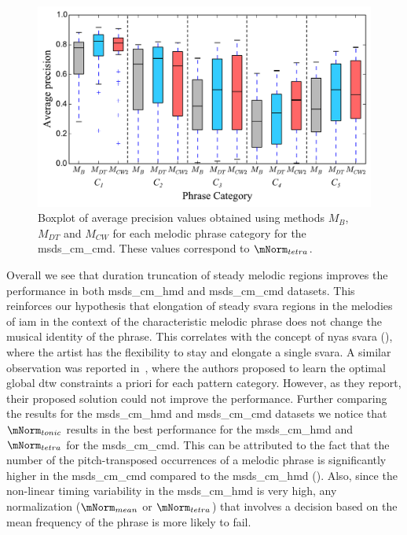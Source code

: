 \begin{figure}
	\begin{center}
		\includegraphics[width=\figSizeEightyFive]{ch06_patterns/figures/ImprovingSimilarity/CarnaticPerCategoryPerformance_BOXPLOT.pdf}
	\end{center}
	\caption{Boxplot of average precision values obtained using methods $M_{B}$, $M_{DT}$ and $M_{CW}$ for each melodic phrase category for the \acrshort{msds_cm_cmd}. These values correspond to $\mNorm_{tetra}$.}
	\label{fig:carnaticPerCategoryPerformance}
\end{figure}


Overall we see that duration truncation of steady melodic regions improves the performance in both \acrshort{msds_cm_hmd} and \acrshort{msds_cm_cmd} datasets. This reinforces our hypothesis that elongation of steady \gls{svara} regions in the melodies of \gls{iam} in the context of the characteristic melodic phrase does not change the musical identity of the phrase. This correlates with the concept of \gls{nyas} \gls{svara} (), where the artist has the flexibility to stay and elongate a single \gls{svara}. A similar observation was reported in~\cite{Rao2014}, where the authors proposed to learn the optimal global \gls{dtw} constraints a priori for each pattern category. However, as they report, their proposed solution could not improve the performance. Further comparing the results for the \acrshort{msds_cm_hmd} and \acrshort{msds_cm_cmd} datasets we notice that $\mNorm_{tonic}$ results in the best performance for the \acrshort{msds_cm_hmd} and $\mNorm_{tetra}$ for the \acrshort{msds_cm_cmd}. This can be attributed to the fact that the number of the pitch-transposed occurrences of a melodic phrase is significantly higher in the \acrshort{msds_cm_cmd} compared to the \acrshort{msds_cm_hmd} (). Also, since the non-linear timing variability in the \acrshort{msds_cm_hmd} is very high, any normalization ($\mNorm_{mean}$ or $\mNorm_{tetra}$) that involves a decision based on the mean frequency of the phrase is more likely to fail.


